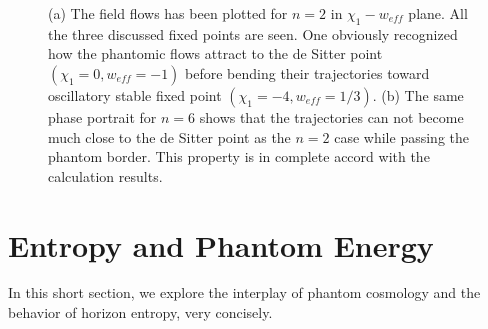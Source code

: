 \documentclass[a4paper,11pt]{article}
\begin{document}
\begin{figure}{\label{fig1}}
\subfigure[]{\texttt{[image: n2]}}%
\hfill
\subfigure[]{\texttt{[image: n6]}}%
\hfill
\captionsetup{width=0.9\linewidth, font=small}
\caption{(a) The field flows has been plotted for $n=2$ in $\chi_1-w_{eff}$ plane. All the three discussed fixed points are seen. One obviously recognized how the phantomic flows attract to the de Sitter point $(\chi_1=0,w_{eff}=-1)$ before bending their trajectories toward oscillatory stable fixed point $(\chi_1=-4,w_{eff}=1/3)$. (b) The same phase portrait for $n=6$ shows that the trajectories can not become much close to the de Sitter point as the $n=2$ case while passing the phantom border. This property is in complete accord with the calculation results.}
\label{n2n5}
\end{figure}

\section{Entropy and Phantom Energy}
In this short section, we explore the interplay of phantom cosmology and the behavior of horizon entropy, very concisely.
 
\end{document}
